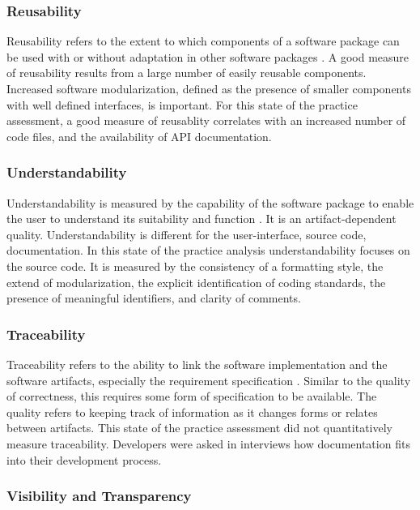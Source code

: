 \documentclass[12pt, notitlepage]{article}
\begin{document}
\subsubsection{Reusability}

Reusability refers to the extent to which components of a software package can be used with or without adaptation in other software packages \citep{kalagiakos2003non}. A good measure of reusability results from a large number of easily reusable components. Increased software modularization, defined as the presence of smaller components with well defined interfaces, is important. For this state of the practice assessment, a good measure of reusablity correlates with an increased number of code files, and the availability of API documentation.

\subsubsection{Understandability}

Understandability is measured by the capability of the software package to enable the user to understand its suitability and function \citep{ISO9126}.
It is an artifact-dependent quality. Understandability is different for the user-interface, source code, documentation. In this state of the practice analysis understandability focuses on the source code. It is measured by the consistency of a formatting style, the extend of modularization, the explicit identification of coding standards, the presence of meaningful identifiers, and clarity of comments. 

\subsubsection{Traceability}

Traceability refers to the ability to link the software implementation and the software artifacts, especially the requirement specification \citep{McCallEtAl1977}. Similar to the quality of correctness, this requires some form of specification to be available. The quality refers to keeping track of information as it changes forms or relates between artifacts. This state of the practice assessment did not quantitatively measure traceability. Developers were asked in interviews how documentation fits into their development process.

\subsubsection{Visibility and Transparency}
\end{document}
